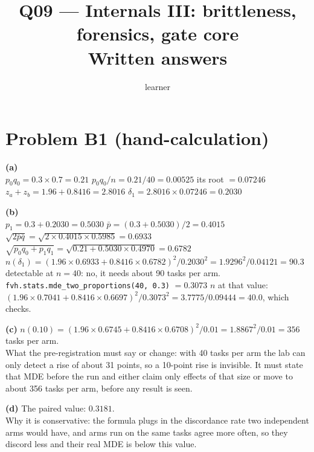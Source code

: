 \documentclass[11pt]{article}
\title{Q09 --- Internals III: brittleness, forensics, gate core \\ \large Written answers}
\author{learner}
\date{}
\begin{document}
\sloppy
\maketitle

\section*{Problem B1 (hand-calculation)}\label{ans:B1}
\begin{answer}
\textbf{(a)} \\
$p_0 q_0 = 0.3 \times 0.7 = 0.21$ \quad $p_0 q_0 / n = 0.21/40 = 0.00525$ \quad its
root $= 0.07246$ \\
$z_a + z_b = 1.96 + 0.8416 = 2.8016$ \quad $\delta_1 = 2.8016 \times 0.07246 = 0.2030$

\textbf{(b)} \\
$p_1 = 0.3 + 0.2030 = 0.5030$ \quad $\bar p = (0.3 + 0.5030)/2 = 0.4015$ \\
$\sqrt{2 \bar p \bar q} = \sqrt{2 \times 0.4015 \times 0.5985} = 0.6933$ \quad
$\sqrt{p_0 q_0 + p_1 q_1} = \sqrt{0.21 + 0.5030 \times 0.4970} = 0.6782$ \\
$n(\delta_1) = (1.96 \times 0.6933 + 0.8416 \times 0.6782)^2 / 0.2030^2 =
1.9296^2 / 0.04121 = 90.3$ \quad detectable at $n = 40$: no, it needs about 90
tasks per arm. \\
\texttt{fvh.stats.mde\_two\_proportions(40, 0.3)} $= 0.3073$ \quad $n$ at that
value: $(1.96 \times 0.7041 + 0.8416 \times 0.6697)^2 / 0.3073^2 = 3.7775/0.09444 =
40.0$, which checks.

\textbf{(c)} $n(0.10) = (1.96 \times 0.6745 + 0.8416 \times 0.6708)^2 / 0.01 =
1.8867^2/0.01 = 356$ tasks per arm. \\
What the pre-registration must say or change: with 40 tasks per arm the lab can
only detect a rise of about 31 points, so a 10-point rise is invisible. It must
state that MDE before the run and either claim only effects of that size or
move to about 356 tasks per arm, before any result is seen.

\textbf{(d)} The paired value: $0.3181$. \\
Why it is conservative: the formula plugs in the discordance rate two
independent arms would have, and arms run on the same tasks agree more often,
so they discord less and their real MDE is below this value.
\end{answer}

\end{document}
